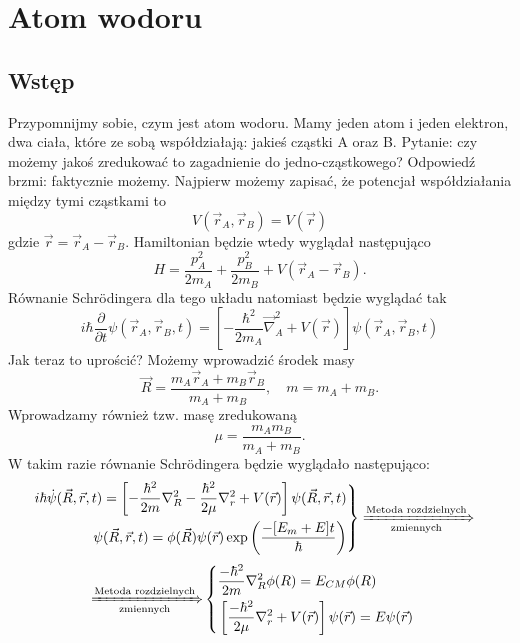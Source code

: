 \section{Atom wodoru}
\subsection{Wstęp}
Przypomnijmy sobie, czym jest atom wodoru. Mamy jeden atom i jeden elektron,
dwa ciała, które ze sobą współdziałają: jakieś cząstki A oraz B.
Pytanie: czy możemy jakoś zredukować to zagadnienie do jedno-cząstkowego?
Odpowiedź brzmi: faktycznie możemy. Najpierw możemy zapisać, że potencjał
współdziałania między tymi cząstkami to
$$
V(\vec{r}_A, \vec{r}_B) = V(\vec{r})
$$
gdzie $\vec{r} = \vec{r}_A - \vec{r}_B$. Hamiltonian będzie wtedy wyglądał następująco
\begin{equation*}
	H =  \frac{p_{A}^{2}}{2 m_{A}}+\frac{p_{B}^{2}}{2 m_{B}} + V(\vec{r} _A- \vec{r}_B).
\end{equation*}
Równanie Schrödingera dla tego układu natomiast będzie wyglądać tak
\begin{equation*}
	i \hbar \frac{\partial}{\partial t} \psi \left(\vec{r}_{A}, \vec{r}_{B}, t\right) = \left[-\frac{\hbar^{2}}{2 m_{A}} \vec{\nabla}_{A}^{2}+V(\vec{r})\right] \psi \left(\vec{r}_{A}, \vec{r}_{B}, t\right)
\end{equation*}
Jak teraz to uprościć? Możemy wprowadzić środek masy
\begin{equation*}
	\vec{R}=\frac{m_{A} \vec{r}_{A}+m_{B} \vec{r}_{B}}{m_{A}+m_{B}}, \quad m = m_A + m_B.
\end{equation*}
Wprowadzamy również tzw. masę zredukowaną
\begin{equation*}
	\mu = \frac{m_A m_B}{m_A + m_B}.
\end{equation*}
W takim razie równanie Schrödingera będzie wyglądało następująco:
\begin{align*}
	&\left.
	\begin{aligned}
		i \hbar\dot{\psi}(\vec{R}, \vec{r}, t)  =  \left[-\frac{\hbar^{2}}{2 m} \nabla_{R}^{2}-\frac{\hbar^{2}}{2 \mu} \nabla_{r}^{2}+V(\vec{r})\right]  \psi(\vec{R}, \vec{r}, t) \\
		\psi(\vec{R}, \vec{r}, t)=\phi(\vec{R}) \psi(\vec{r}) \exp \left(\frac{-[E_m + E]t}{\hbar}\right)
	\end{aligned}
	\right\}
	\xRightarrow[\text{zmiennych}]{\text{Metoda rozdzielnych}}
\end{align*}
\begin{align*}
	\xRightarrow[\text{zmiennych}]{\text{Metoda rozdzielnych}}
	&\left\{
	\begin{aligned}
		&\frac{-\hbar^{2}}{2 m} \nabla_{R}^{2} \phi(R)=E_{CM} \phi(R)\\
		&\left[\frac{-\hbar^{2}}{2 \mu} \nabla_{r}^{2}+V(\vec{r})\right] \psi(\vec{r})=E \psi(\vec{r})
	\end{aligned}
	\right.
\end{align*}
